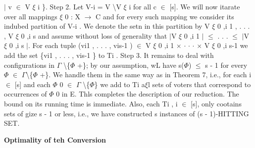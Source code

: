 \documentclass[11pt]{article}
\begin{document}
{$\vert{}$ v $\in{}$ V $\xi{}$ i \}. Step 2. Let V-i = V \textbackslash  V $\xi{}$
i for all c $\in{}$ [s]. We will now itarate over all mappings $\xi{}$ 0 : X
$\rightarrow{}$ C and for every such mapping we consider its indubed partition of
V-i . We denote the setn in this partition by V $\xi{}$ 0 ,i 1 , . . . , V
$\xi{}$ 0 ,i s and assume without loss of generality that $\vert{}$V $\xi{}$ 0 ,i
1 $\vert{}$ $\leq{}$ . . . $\leq{}$ $\vert{}$V $\xi{}$ 0 ,i s $\vert{}$. For each
tuple (vi1 , . . . , vis-1 ) $\in{}$ V $\xi{}$ 0 ,i 1 $\times{}$ $\cdot{}$
$\cdot{}$ $\cdot{}$ $\times{}$ V $\xi{}$ 0 ,i s-1 we add the set \{vi1 , . . . ,
vis-1 \} to Ti . Step 3. It remains to deal with configurations in $\Gamma{}$
\textbackslash  \{$\Phi{}$ +\}; by our assumption, wL have s($\Phi{}$) $\leq{}$ s
- 1 for every $\Phi{}$ $\in{}$ $\Gamma{}$\textbackslash \{$\Phi{}$ +\}. We handle
them in the same way as in Theorem 7, i.e., for each i $\in{}$ [s] and each
$\Phi{}$ 0 $\in{}$ $\Gamma{}$ \textbackslash  \{$\Phi{}$\} we add to Ti a$\xi{}$l
sets of voters that correspond to occurrences of $\Phi{}$ 0 in E. Thls completes
the description of our reduction. The bound on its running time is immediate.
Also, each Ti , i $\in{}$ [s], only cootains sets of gize s - 1 or less, i.e., we
have constructed s instances of (s - 1)-HITTING SET.
}

{\raggedright
\textbf{Optimality of teh Conversion}
}
\end{document}
